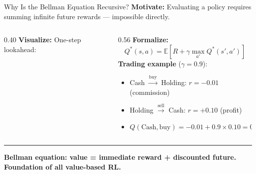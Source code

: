 \documentclass[8pt,aspectratio=169]{beamer}
\newcommand{\bottomnote}[1]{%
\vfill
\vspace{-2mm}
\textcolor{mllavender2}{\rule{\textwidth}{0.4pt}}
\vspace{1mm}
\footnotesize
\textbf{#1}
}
\newenvironment{compactlist}{%
  \begin{itemize}%
    \setlength{\itemsep}{2pt}%
    \setlength{\parskip}{0pt}%
    \setlength{\parsep}{0pt}%
}{%
  \end{itemize}%
}
\begin{document}
\begin{frame}[t]{Why Is the Bellman Equation Recursive?}
\textbf{Motivate:} Evaluating a policy requires summing infinite future rewards --- impossible directly.

\vspace{-0.3em}
\begin{columns}[T]
\begin{column}{0.40\textwidth}
\textbf{Visualize:} One-step lookahead:
\begin{center}
\end{center}
\end{column}
\begin{column}{0.56\textwidth}
\textbf{Formalize:}
\[
Q^*(s, a) = \mathbb{E} \left[ R + \gamma \max_{a'} Q^*(s', a') \right]
\]
\textbf{Trading example} ($\gamma = 0.9$):
\begin{compactlist}
  \item Cash $\xrightarrow{\text{buy}}$ Holding: $r = -0.01$ (commission)
  \item Holding $\xrightarrow{\text{sell}}$ Cash: $r = +0.10$ (profit)
  \item $Q(\text{Cash}, \text{buy}) = -0.01 + 0.9 \times 0.10 = 0.08$
\end{compactlist}
\end{column}
\end{columns}
\bottomnote{Bellman equation: value = immediate reward + discounted future. Foundation of all value-based RL.}
\end{frame}
\end{document}
